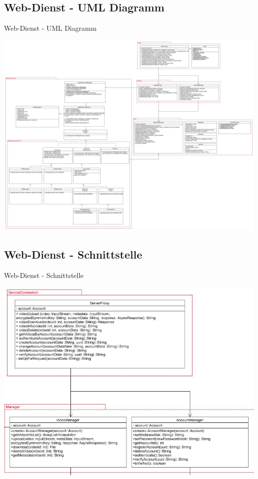 \documentclass[19pt]{beamer}
\begin{document}
\subsection{Web-Dienst - UML Diagramm}
\begin{frame}{Web-Dienst - UML Diagramm}
\begin{center}
\includegraphics[scale=0.093]{resources/UMLSERVERPCC.jpg}
\end{center}
\end{frame}
\subsection{Web-Dienst - Schnittstelle}
\begin{frame}{Web-Dienst - Schnittstelle}
\begin{center}
\includegraphics[scale=0.3]{resources/service_rest.png}
\end{center}
\end{frame}
\end{document}

